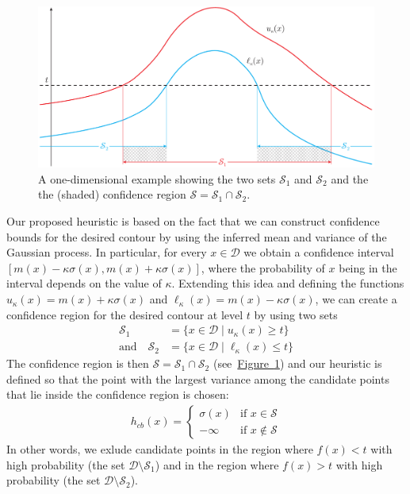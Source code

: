 \documentclass[11pt]{article} %
\newcommand{\figref}[1]{\hyperref[#1]{\mbox{Figure~\ref*{#1}}}}
\newcommand{\twopartdef}[4]
{
	\left\{
		\begin{array}{ll}
			#1 & \mbox{if } #2 \\
			#3 & \mbox{if } #4
		\end{array}
	\right.
}
\begin{document}
\begin{figure}[tb]
  \centering
  \includegraphics[width=\textwidth]{figures/cb}
  \caption{A one-dimensional example showing the two sets $\mathcal{S}_1$ and
           $\mathcal{S}_2$ and the
           the (shaded) confidence region
           $\mathcal{S} = \mathcal{S}_1\cap\mathcal{S}_2$.}
  \label{fig:cb}
\end{figure}

Our proposed heuristic is based on the fact that we can construct confidence
bounds for the desired contour by using the inferred mean and variance of
the Gaussian process. In particular, for every $x \in \mathcal{D}$ we obtain
a confidence interval ${[m(x) - \kappa\sigma(x), m(x) + \kappa\sigma(x)]}$,
where the probability of $x$ being in the interval depends on the value
of $\kappa$. Extending this idea and defining the functions
$u_{\kappa}(x) = m(x) + \kappa\sigma(x)$ and
$\ell_{\kappa}(x) = m(x) - \kappa\sigma(x)$,
we can create a confidence region for
the desired contour at level $t$ by using two sets
\begin{align*}
  \mathcal{S}_1 &= \{x \in \mathcal{D} \mid u_{\kappa}(x) \geq t\}\\
  \text{and}\hspace{1em}
  \mathcal{S}_2 &= \{x \in \mathcal{D} \mid \ell_{\kappa}(x) \leq t\}
\end{align*}
The confidence region is then
$\mathcal{S} = \mathcal{S}_1\cap\mathcal{S}_2$ (see~\figref{fig:cb}) and our
heuristic is defined
so that the point with the largest variance among the candidate points that
lie inside the confidence region is chosen:
\begin{align}\label{eq:hcb}
  h_{cb}(x) = \twopartdef { \sigma(x) } {x \in \mathcal{S}} {-\infty} {x \notin \mathcal{S}}
\end{align}
In other words, we exlude candidate points in the region where
$f(x) < t$ with high probability (the set $\mathcal{D}\setminus\mathcal{S}_1$)
and in the region where $f(x) > t$ with high probability
(the set $\mathcal{D}\setminus\mathcal{S}_2$).
\end{document}
